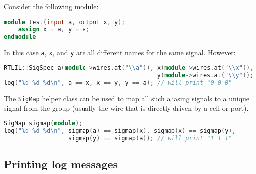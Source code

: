 \begin{frame}[t, fragile]{\subsecname}
Consider the following module:

\smallskip
\begin{lstlisting}[xleftmargin=1cm, basicstyle=\ttfamily\fontsize{8pt}{10pt}\selectfont, language=Verilog]
module test(input a, output x, y);
    assign x = a, y = a;
endmodule
\end{lstlisting}

In this case {\tt a}, {\tt x}, and {\tt y} are all different names for the same signal. However:

\smallskip
\begin{lstlisting}[xleftmargin=1cm, basicstyle=\ttfamily\fontsize{8pt}{10pt}\selectfont, language=C++]
RTLIL::SigSpec a(module->wires.at("\\a")), x(module->wires.at("\\x")),
                                           y(module->wires.at("\\y"));
log("%d %d %d\n", a == x, x == y, y == a); // will print "0 0 0"
\end{lstlisting}

The {\tt SigMap} helper class can be used to map all such aliasing signals to a
unique signal from the group (usually the wire that is directly driven by a cell or port).

\smallskip
\begin{lstlisting}[xleftmargin=1cm, basicstyle=\ttfamily\fontsize{8pt}{10pt}\selectfont, language=C++]
SigMap sigmap(module);
log("%d %d %d\n", sigmap(a) == sigmap(x), sigmap(x) == sigmap(y),
                  sigmap(y) == sigmap(a)); // will print "1 1 1"
\end{lstlisting}
\end{frame}


\subsection{Printing log messages}

